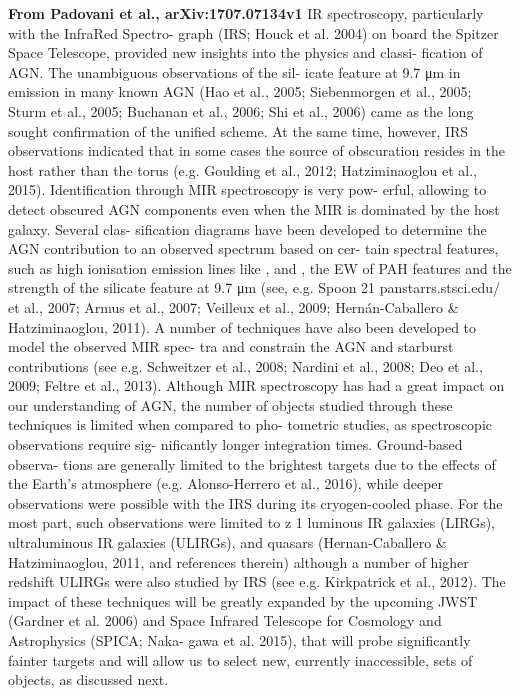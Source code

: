 {\bf From Padovani et al.,  arXiv:1707.07134v1}
IR spectroscopy, particularly with the InfraRed Spectro- graph (IRS;
Houck et al. 2004) on board the Spitzer Space Telescope, provided new
insights into the physics and classi- fication of AGN. The unambiguous
observations of the sil- icate feature at 9.7 μm in emission in many
known AGN (Hao et al., 2005; Siebenmorgen et al., 2005; Sturm et al.,
2005; Buchanan et al., 2006; Shi et al., 2006) came as the long sought
confirmation of the unified scheme. At the same time, however, IRS
observations indicated that in some cases the source of obscuration
resides in the host rather than the torus (e.g. Goulding et al., 2012;
Hatziminaoglou et al., 2015).  Identification through MIR spectroscopy
is very pow- erful, allowing to detect obscured AGN components even
when the MIR is dominated by the host galaxy. Several clas- sification
diagrams have been developed to determine the AGN contribution to an
observed spectrum based on cer- tain spectral features, such as high
ionisation emission lines like \nev, \neii and \oiv, the EW of
PAH features and the strength of the silicate feature at 9.7 μm (see,
e.g. Spoon 21 panstarrs.stsci.edu/ et al., 2007; Armus et al., 2007;
Veilleux et al., 2009; Hernán-Caballero \& Hatziminaoglou, 2011). A
number of techniques have also been developed to model the observed
MIR spec- tra and constrain the AGN and starburst contributions (see
e.g. Schweitzer et al., 2008; Nardini et al., 2008; Deo et al., 2009;
Feltre et al., 2013).  Although MIR spectroscopy has had a great
impact on our understanding of AGN, the number of objects studied
through these techniques is limited when compared to pho- tometric
studies, as spectroscopic observations require sig- nificantly longer
integration times. Ground-based observa- tions are generally limited
to the brightest targets due to the effects of the Earth’s atmosphere
(e.g. Alonso-Herrero et al., 2016), while deeper observations were
possible with the IRS during its cryogen-cooled phase. For the most
part, such observations were limited to z 1 luminous IR galaxies
(LIRGs), ultraluminous IR galaxies (ULIRGs), and quasars (Hernan-Caballero \& Hatziminaoglou, 2011, and references therein) although a
number of higher redshift ULIRGs were also studied by IRS (see
e.g. Kirkpatrick et al., 2012). The impact of these techniques will be
greatly expanded by the upcoming JWST (Gardner et al. 2006) and Space
Infrared Telescope for Cosmology and Astrophysics (SPICA; Naka- gawa
et al. 2015), that will probe significantly fainter targets and will
allow us to select new, currently inaccessible, sets of objects, as
discussed next.


